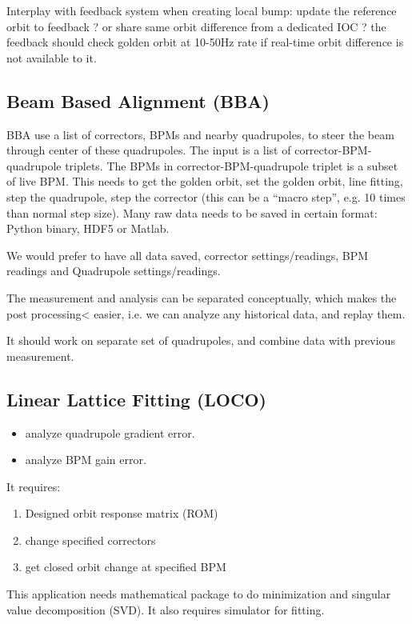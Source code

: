 \documentclass[11pt,oneside,letterpaper,showtrims,article]{memoir}
\begin{document}
Interplay with feedback system when creating local bump: update the
reference orbit to feedback ? or share same orbit difference from a
dedicated IOC ? the feedback should check golden orbit at 10-50Hz rate
if real-time orbit difference is not available to it.


\subsection{Beam Based Alignment (BBA)}

BBA use a list of correctors, BPMs and nearby quadrupoles, to steer the
beam through center of these quadrupoles. The input is a list of
corrector-BPM-quadrupole triplets.  The BPMs in corrector-BPM-quadrupole
triplet is a subset of live BPM.  This needs to get the golden orbit,
set the golden orbit, line fitting, step the quadrupole, step the
corrector (this can be a ``macro step'', e.g. 10 times than normal step
size). Many raw data needs to be saved in certain format: Python binary, HDF5 or Matlab.

We would prefer to have all data saved, corrector settings/readings, BPM
readings and Quadrupole settings/readings.

The measurement and analysis can be separated conceptually, which makes
the post processing< easier, i.e. we can analyze any historical data,
and replay them.

It should work on separate set of quadrupoles, and combine data with previous measurement.

\subsection{Linear Lattice Fitting (LOCO)}

\begin{itemize}%
\item analyze quadrupole gradient error.
\item analyze BPM gain error.
\end{itemize}

It requires:
\begin{enumerate}
\item Designed orbit response matrix (ROM)
\item change specified correctors 
\item get closed orbit change at specified BPM
\end{enumerate}

This application needs mathematical package to do minimization and
singular value decomposition (SVD). It also requires simulator for
fitting.
\end{document}
